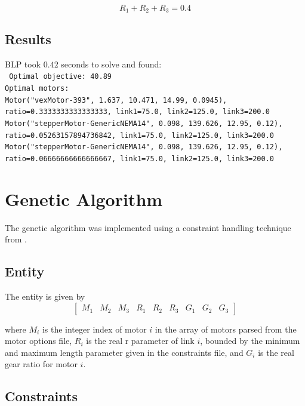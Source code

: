 \documentclass{article}
\begin{document}
\begin{equation}
    R_1 + R_2 + R_3 = 0.4
\end{equation}

\FloatBarrier{}
\subsection{Results}

BLP took $0.42$ seconds to solve and found: \\
\texttt{
    Optimal objective: 40.89 \\
    Optimal motors: \\
    Motor("vexMotor-393", 1.637, 10.471, 14.99, 0.0945), ratio=0.3333333333333333, link1=75.0, link2=125.0, link3=200.0 \\
    Motor("stepperMotor-GenericNEMA14", 0.098, 139.626, 12.95, 0.12), ratio=0.05263157894736842, link1=75.0, link2=125.0, link3=200.0 \\
    Motor("stepperMotor-GenericNEMA14", 0.098, 139.626, 12.95, 0.12), ratio=0.06666666666666667, link1=75.0, link2=125.0, link3=200.0
}

\FloatBarrier{}
\section{Genetic Algorithm}

The genetic algorithm was implemented using a constraint handling technique
from \cite{chehouri2016constraint}.

\FloatBarrier{}
\subsection{Entity}

The entity is given by
\begin{equation}
    \begin{bmatrix}
        M_1 & M_2 & M_3 & R_1 & R_2 & R_3 & G_1 & G_2 & G_3
    \end{bmatrix}
\end{equation}

where $M_i$ is the integer index of motor $i$ in the array of motors parsed
from the motor options file, $R_i$ is the real r parameter of link $i$, bounded
by the minimum and maximum length parameter given in the constraints file, and
$G_i$ is the real gear ratio for motor $i$.

\FloatBarrier{}
\subsection{Constraints}
\end{document}
